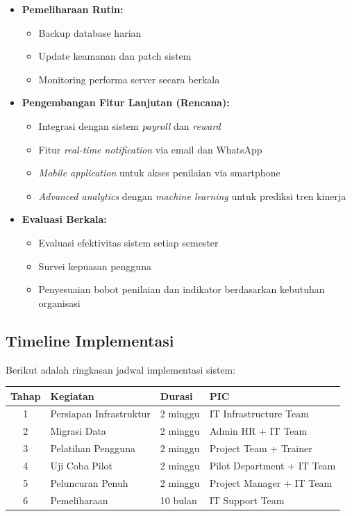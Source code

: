 \documentclass[12pt,a4paper,oneside]{report}
\begin{document}
\begin{itemize}
  \item \textbf{Pemeliharaan Rutin:}
    \begin{itemize}
      \item Backup database harian
      \item Update keamanan dan patch sistem
      \item Monitoring performa server secara berkala
    \end{itemize}
  \item \textbf{Pengembangan Fitur Lanjutan (Rencana):}
    \begin{itemize}
      \item Integrasi dengan sistem \textit{payroll} dan \textit{reward}
      \item Fitur \textit{real-time notification} via email dan WhatsApp
      \item \textit{Mobile application} untuk akses penilaian via smartphone
      \item \textit{Advanced analytics} dengan \textit{machine learning} untuk prediksi tren kinerja
    \end{itemize}
  \item \textbf{Evaluasi Berkala:}
    \begin{itemize}
      \item Evaluasi efektivitas sistem setiap semester
      \item Survei kepuasan pengguna
      \item Penyesuaian bobot penilaian dan indikator berdasarkan kebutuhan organisasi
    \end{itemize}
\end{itemize}

\subsection{Timeline Implementasi}

Berikut adalah ringkasan jadwal implementasi sistem:

\begin{longtable}{|c|p{4cm}|p{3cm}|p{4cm}|}
  \hline
  \textbf{Tahap} & \textbf{Kegiatan} & \textbf{Durasi} & \textbf{PIC} \\
  \hline
  1 & Persiapan Infrastruktur & 2 minggu & IT Infrastructure Team \\
  \hline
  2 & Migrasi Data & 2 minggu & Admin HR + IT Team \\
  \hline
  3 & Pelatihan Pengguna & 2 minggu & Project Team + Trainer \\
  \hline
  4 & Uji Coba Pilot & 2 minggu & Pilot Department + IT Team \\
  \hline
  5 & Peluncuran Penuh & 2 minggu & Project Manager + IT Team \\
  \hline
  6 & Pemeliharaan & 10 bulan & IT Support Team \\
  \hline
\end{longtable}
\end{document}

